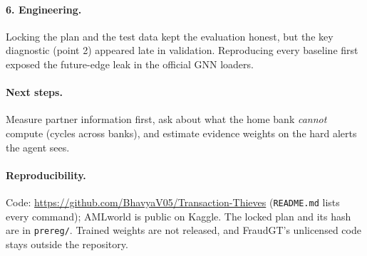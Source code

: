 \documentclass[11pt,a4paper]{article}
\begin{document}
\paragraph{6. Engineering.} Locking the plan and the test data kept the evaluation honest, but the key diagnostic (point 2) appeared late in validation. Reproducing every baseline first exposed the future-edge leak in the official GNN loaders.

\paragraph{Next steps.} Measure partner information first, ask about what the home bank \emph{cannot} compute (cycles across banks), and estimate evidence weights on the hard alerts the agent sees.

\paragraph{Reproducibility.}\sloppy Code: \url{https://github.com/BhavyaV05/Transaction-Thieves} (\texttt{README.md} lists every command); AMLworld is public on Kaggle. The locked plan and its hash are in \texttt{prereg/}. Trained weights are not released, and FraudGT's unlicensed code stays outside the repository.
\end{document}
